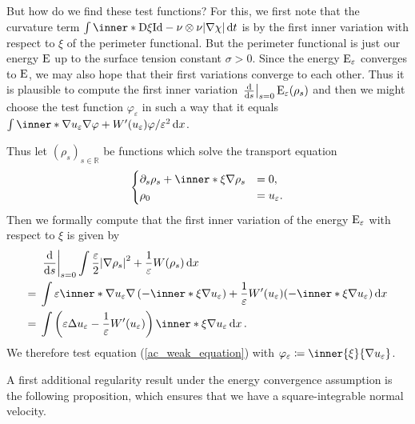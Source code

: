 But how do we find these test functions? For this, we first note that the 
curvature term
$ \int \inner*{ \diff \xi }{ \mathrm{Id} - \nu \otimes \nu } \abs{ \nabla \chi 
} \dd{ t } $ is by \cite[Thm.~17.5]{maggi_sets_of_finite_perimeter} the first 
inner variation with respect to $ \xi $ of the perimeter functional.
But the perimeter functional is 
just our energy $ \operatorname{E} $ up to the surface tension constant $ \sigma > 0 $. 
Since the energy $ \operatorname{E}_{ \varepsilon } $ converges to $ \operatorname{E} $, we may 
also hope that their first variations converge to each other. Thus it is 
plausible to compute the first inner variation 
$ \left.\dv{ s } \right|_{ s = 0 } \operatorname{E}_{ \varepsilon } ( \rho_{ s } ) $ and 
then we might choose the test function $ \varphi_{ \varepsilon } $ in 
such a way that it equals
$ 
\int
\inner*{ \nabla u_{ \varepsilon } }{ \nabla \varphi }
+
 W' ( u_{ \varepsilon} ) \varphi / \varepsilon^{ 2 }
\dd{x}
$.

Thus let $ ( \rho_{ s } )_{ s \in \mathbb{ R } } $ be functions which solve the 
transport equation
\[
\begin{cases}
	\partial_{ s } \rho_{ s } 
	+
	\inner*{ \xi }{ \nabla \rho_{ s } }
	& = 0,
	\\
	\rho_{ 0 } & = u_{ \varepsilon }.
\end{cases}
\]
Then we formally compute that the first inner variation of the energy $ 
\operatorname{E}_{ \varepsilon } $ with respect to $ \xi $ is given by
\begin{align*}
	& \left.\dv{ s }\right|_{ s = 0 }
	\int
	\frac{ \varepsilon }{ 2 }
	\abs{ \nabla \rho_{ s } }^{ 2 }
	+
	\frac{ 1 }{ \varepsilon }
	W ( \rho_{ s } )
	\dd{ x }
	\\
	={} &
	\int
	\varepsilon 
	\inner*{ \nabla u_{ \varepsilon } }
	{ \nabla \left( - \inner*{ \xi }{ \nabla u_{ \varepsilon } } \right) }
	+
	\frac{ 1 }{ \varepsilon }
	W'( u_{ \varepsilon } ) ( -\inner*{ \xi }{ \nabla u_{ \varepsilon } } )
	\dd{ x }
	\\
	={} &
	\int
	\left(
	\varepsilon \Delta u_{ \varepsilon } - \frac{ 1 }{ \varepsilon } W'( u_{ 
	\varepsilon } )
	\right)
	\inner*{ \xi }{ \nabla u_{ \varepsilon } } 
	\dd{ x }.
\end{align*}
We therefore test equation (\ref{ac_weak_equation}) with $ \varphi_{ 
\varepsilon } \coloneqq \inner{ \xi }{ \nabla u_{ \varepsilon } } $.

A first additional regularity result under the energy convergence assumption is 
the following proposition, which ensures that we have a square-integrable 
normal velocity.

